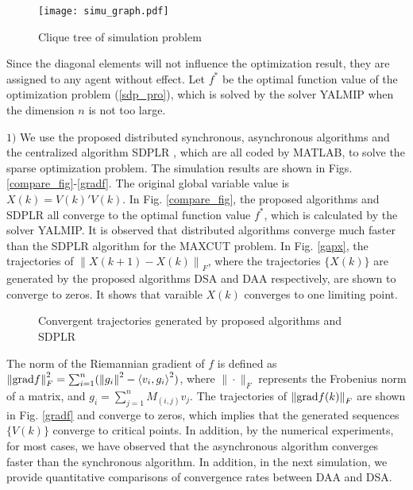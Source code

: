 \documentclass[journal]{IEEEtran}
\begin{document}
\begin{figure}
	\centering
	\texttt{[image: simu\_graph.pdf]}\\
	\caption{Clique tree of simulation problem}\label{simu_graph}
	\centering
\end{figure}
\par Since the diagonal elements will not influence the optimization result, they are assigned to any agent without effect. Let $f^*$ be the optimal function value of the optimization problem (\ref{sdp_pro}), which is solved by the solver YALMIP when the dimension $n$ is not too large. %
\par $1)$ We use the proposed distributed synchronous, asynchronous algorithms and the centralized algorithm SDPLR \cite{BM_SPLR}, which are all coded by MATLAB, to solve the sparse optimization problem. The simulation results are shown in Figs. \ref{compare_fig}-\ref{gradf}. The original global variable value is $X(k)=V(k)'V(k)$. In Fig. \ref{compare_fig}, the proposed algorithms and SDPLR all converge to the optimal function value $f^*$, which is calculated by the solver YALMIP. It is observed that distributed algorithms converge much faster than the SDPLR algorithm for the MAXCUT problem. In Fig. \ref{gapx}, the trajectories of $\left\|X(k+1)-X(k)\right\|_F$, where the trajectories $\{X(k)\}$ are generated by the proposed algorithms DSA and DAA respectively, are shown to converge to zeros. It shows that varaible $X(k)$ converges to one limiting point.
\begin{figure}
	\centering
	
	\caption{Convergent trajectories generated by proposed algorithms and SDPLR}
\end{figure}
The norm of the Riemannian gradient of $f$ is defined as $\left\|{\rm grad}f\right\|_F^2=\sum_{i=1}^n(\left\|{g}_i\right\|^2-\left<v_i,{g}_i\right>^2)$, where $\|\cdot\|_F$ represents the Frobenius norm of a matrix, and $g_i=\sum_{j=1}^n M_{(i,j)}v_j$. The trajectories of $\left\|{\rm grad} f(k)\right\|_F$ are shown in Fig. \ref{gradf} and converge to zeros, which implies that the generated sequences $\{V(k)\}$ converge to critical points. In addition, by the numerical experiments, for most cases, we have observed that the asynchronous algorithm converges faster than the synchronous algorithm. In addition, in the next simulation, we provide quantitative comparisons of convergence rates between DAA and DSA.
\end{document}
